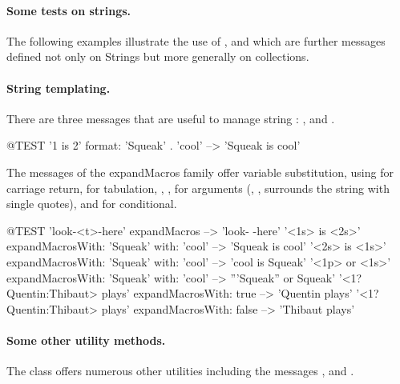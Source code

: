 \documentclass[a4paper,10pt,twoside]{book}
\begin{document}
\paragraph{Some tests on strings.} The  following examples illustrate the use of \mbox{,}  and  which are further messages defined not only on Strings but more generally on collections. 


\paragraph{String templating.}
There are three messages that are useful to manage string : ,  and .

\begin{code}{@TEST}
'{1} is {2}' format: {'Squeak' . 'cool'}  --> 'Squeak is cool'
\end{code}

The messages of the expandMacros family offer variable substitution, using  for carriage return,  for tabulation, , ,  for arguments (, , surrounds the string with single quotes), and  for conditional.

\begin{code}{@TEST}
'look-<t>-here' expandMacros                                         --> 'look-	-here'
'<1s> is <2s>' expandMacrosWith: 'Squeak' with: 'cool'   --> 'Squeak is cool'
'<2s> is <1s>' expandMacrosWith: 'Squeak' with: 'cool'   --> 'cool is Squeak'
'<1p> or <1s>' expandMacrosWith: 'Squeak' with: 'cool'  --> '''Squeak'' or Squeak'
'<1?Quentin:Thibaut> plays' expandMacrosWith: true     --> 'Quentin plays'
'<1?Quentin:Thibaut> plays' expandMacrosWith: false    --> 'Thibaut plays'
\end{code}

\paragraph{Some other utility methods.}
The class  offers numerous other utilities including the messages ,  and . 
\end{document}

